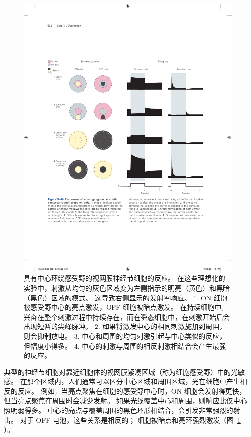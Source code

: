 \begin{figure}[htbp]
	\centering
	\includegraphics[width=1.0\linewidth]{chap22/fig_22_10}
	\caption{具有中心环绕感受野的视网膜神经节细胞的反应。 
		在这些理想化的实验中，刺激从均匀的灰色区域变为左侧指示的明亮（黄色）和黑暗（黑色）区域的模式。 这导致右侧显示的发射率响应。 
		1. ON 细胞被感受野中心的亮点激发，OFF 细胞被暗点激发。 在持续细胞中，兴奋在整个刺激过程中持续存在，而在瞬态细胞中，在刺激开始后会出现短暂的尖峰脉冲。 
		2. 如果将激发中心的相同刺激施加到周围，则会抑制放电。 
		3. 中心和周围的均匀刺激引起与中心类似的反应，但幅度小得多。 
		4. 中心的刺激与周围的相反刺激相结合会产生最强的反应。}
	\label{fig:22_10}
\end{figure}


典型的神经节细胞对靠近细胞体的视网膜紧凑区域（称为细胞感受野）中的光敏感。
在那个区域内，人们通常可以区分中心区域和周围区域，光在细胞中产生相反的反应。
例如，当亮点聚焦在细胞的感受野中心时，ON 细胞会发射得更快，但当亮点聚焦在周围时会减少发射。
如果光线覆盖中心和周围，则响应比仅中心照明弱得多。 
中心的亮点与覆盖周围的黑色环形相结合，会引发非常强烈的射击。
对于 OFF 电池，这些关系是相反的； 细胞被暗点和亮环强烈激发（图~\ref{fig:22_10} ）。



